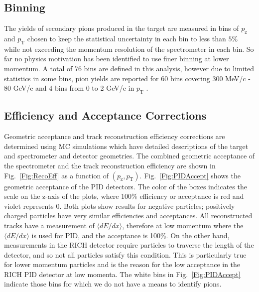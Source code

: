\documentclass[%
aps, prd, reprint, show pacs, preprint numbers, ams math, amssymb, superscriptaddress, linenumbers]{revtex4-1}
\newcommand{\dedx}{\ensuremath{\langle dE/dx\rangle}\xspace}
\def\pzpt{$(p_\mathrm{z},p_\mathrm{T})$\xspace}
\begin{document}
\subsection{Binning}
The yields of secondary pions produced in the target are measured in bins of $p_\mathrm{z}$ and $p_\mathrm{T}$ chosen to keep the statistical uncertainty in each bin to less than $5\%$ while not exceeding the momentum resolution of the spectrometer in each bin.  So far no physics motivation has been identified to use finer binning at lower momentum.  A total of 76 bins are defined in this analysis, however due to limited statistics in some bins, pion yields are reported for 60 bins covering 300 MeV/c - 80 GeV/c and 4 bins from 0 to 2 GeV/c in $p_\mathrm{T}$ .

\subsection{Efficiency and Acceptance Corrections}
Geometric acceptance and track reconstruction efficiency corrections are determined using MC simulations which have detailed descriptions of the target and spectrometer and detector geometries.  The combined geometric acceptance of the spectrometer and the track reconstruction efficiency are shown in Fig.~\ref{Fig:RecoEff} as a function of \pzpt.  Fig.~\ref{Fig:PIDAccept} shows the geometric acceptance of the PID detectors.  The color of the boxes indicates the scale on the z-axis of the plots, where 100\% efficiency or acceptance is red and violet represents 0.  Both plots show results for negative particles; positively charged particles have very similar efficiencies and acceptances.  All reconstructed tracks have a measurement of \dedx, therefore at low momentum where the \dedx is used for PID, and the acceptance is 100\%.  On the other hand, measurements in the RICH detector require particles to traverse the length of the detector, and so not all particles satisfy this condition.  This is particularly true for lower momentum particles and is the reason for the low acceptance in the RICH PID detector at low momenta.  The white bins in Fig.~\ref{Fig:PIDAccept} indicate those bins for which we do not have a means to identify pions.
\end{document}
